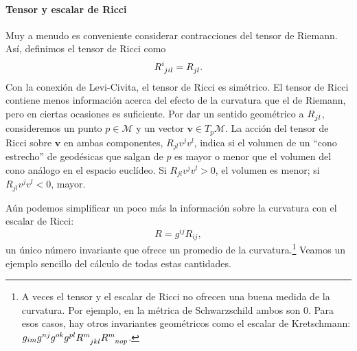 \paragraph{Tensor y escalar de Ricci} Muy a menudo es conveniente considerar contracciones del tensor de Riemann. Así, definimos el tensor de Ricci como
\begin{equation}
    \tensor{R}{^i_{jil}} = \tensor{R}{_{jl}}.
\end{equation}
Con la conexión de Levi-Civita, el tensor de Ricci es simétrico. El tensor de Ricci contiene menos información acerca del efecto de la curvatura que el de Riemann, pero en ciertas ocasiones es suficiente. Por dar un sentido geométrico a \(\tensor{R}{_{jl}}\), consideremos un punto \(p\in\mathcal{M}\) y un vector \(\mathbf{v}\in T_p\mathcal{M}\). La acción del tensor de Ricci sobre \(\mathbf{v}\) en ambas componentes, \(R_{jl}v^j v^l\), indica si el volumen de un ``cono estrecho'' de geodésicas que salgan de \(p\) es mayor o menor que el volumen del cono análogo en el espacio euclídeo. Si \(R_{jl}v^j v^l>0\), el volumen es menor; si \(R_{jl}v^j v^l<0\), mayor.

Aún podemos simplificar un poco más la información sobre la curvatura con el escalar de Ricci:
\begin{equation}
    R = g^{ij}R_{ij},
\end{equation}
un único número invariante que ofrece un promedio de la curvatura.\footnote{A veces el tensor y el escalar de Ricci no ofrecen una buena medida de la curvatura. Por ejemplo, en la métrica de Schwarzschild ambos son 0. Para esos casos, hay otros invariantes geométricos como el escalar de Kretschmann: \(g_{im}g^{nj}g^{ok}g^{pl}\tensor{R}{^m_{jkl}} \tensor{R}{^m_{nop}}\).} Veamos un ejemplo sencillo del cálculo de todas estas cantidades.

